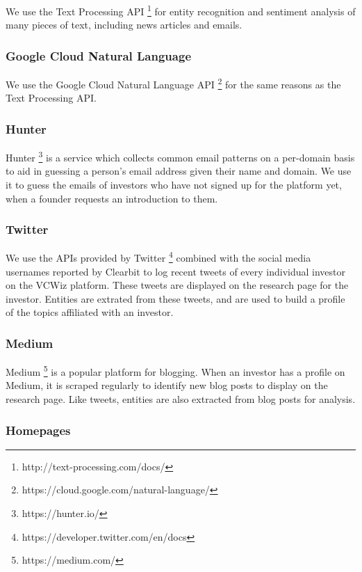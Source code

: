 We use the Text Processing API \footnote{http://text-processing.com/docs/} for entity recognition and sentiment analysis of many pieces of text, including news articles and emails.

\subsubsection{Google Cloud Natural Language}

We use the Google Cloud Natural Language API \footnote{https://cloud.google.com/natural-language/} for the same reasons as the Text Processing API.

\subsubsection{Hunter}

Hunter \footnote{https://hunter.io/} is a service which collects common email patterns on a per-domain basis to aid in guessing a person's email address given their name and domain. We use it to guess the emails of investors who have not signed up for the platform yet, when a founder requests an introduction to them.

\subsubsection{Twitter}

We use the APIs provided by Twitter \footnote{https://developer.twitter.com/en/docs} combined with the social media usernames reported by Clearbit to log recent tweets of every individual investor on the VCWiz platform. These tweets are displayed on the research page for the investor. Entities are extrated from these tweets, and are used to build a profile of the topics affiliated with an investor.

\subsubsection{Medium}

Medium \footnote{https://medium.com/} is a popular platform for blogging. When an investor has a profile on Medium, it is scraped regularly to identify new blog posts to display on the research page. Like tweets, entities are also extracted from blog posts for analysis.

\subsubsection{Homepages}

